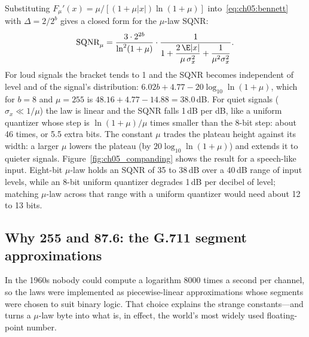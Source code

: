 Substituting $F_\mu'(x)=\mu/[(1+\mu|x|)\ln(1+\mu)]$ into~\eqref{eq:ch05:bennett} with
$\Delta=2/2^b$ gives a closed form for the $\mu$-law SQNR:
\begin{equation}
\text{SQNR}_\mu=\frac{3\cdot2^{2b}}{\ln^2(1+\mu)}\cdot
\frac{1}{1+\dfrac{2\,\E|x|}{\mu\,\sigma_x^2}+\dfrac{1}{\mu^2\sigma_x^2}}.
\label{eq:ch05:musqnr}
\end{equation}
For loud signals the bracket tends to 1 and the SQNR becomes independent of level and of the
signal's distribution:
$6.02b+4.77-20\log_{10}\ln(1+\mu)$, which for $b=8$ and $\mu=255$ is
$48.16+4.77-14.88=38.0$\,dB. For quiet signals ($\sigma_x\ll1/\mu$) the law is linear and the
SQNR falls 1\,dB per dB, like a uniform quantizer whose step is $\ln(1+\mu)/\mu$ times smaller
than the 8-bit step: about 46 times, or 5.5 extra bits. The constant $\mu$ trades the plateau
height against its width: a larger $\mu$ lowers the plateau (by $20\log_{10}\ln(1+\mu)$) and
extends it to quieter signals. Figure~\ref{fig:ch05_companding} shows the result for a
speech-like input. Eight-bit $\mu$-law holds an SQNR of 35 to 38\,dB over a 40\,dB range of input
levels, while an 8-bit uniform quantizer degrades 1\,dB per decibel of level; matching $\mu$-law
across that range with a uniform quantizer would need about 12 to 13 bits.


\subsection{Why 255 and 87.6: the G.711 segment approximations}
\label{sec:ch05:g711}

In the 1960s nobody could compute a logarithm 8000 times a second per channel, so the laws were
implemented as piecewise-linear approximations whose segments were chosen to suit binary
logic. That choice explains the strange constants---and turns a $\mu$-law byte into what is, in
effect, the world's most widely used floating-point number.

